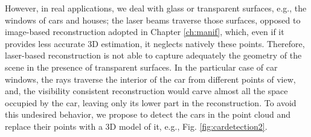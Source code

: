 However, in real applications, we deal with glass or transparent surfaces, e.g., the windows of cars and houses; the laser beams traverse those surfaces, opposed to image-based reconstruction adopted in Chapter \ref{ch:manif}, which, even if it provides less accurate 3D estimation, it neglects natively these points.
Therefore, laser-based reconstruction is not able to capture adequately the geometry of the scene in the presence of transparent surfaces. 
In the particular case of car windows, the rays traverse the interior of the car from different points of view, and, the visibility consistent reconstruction would carve almost all the space occupied by the car, leaving only its lower part in the reconstruction.
To avoid this undesired behavior, we propose to detect the cars in the point cloud and replace their points with a 3D model of it, e.g., Fig. \ref{fig:cardetection2}.

